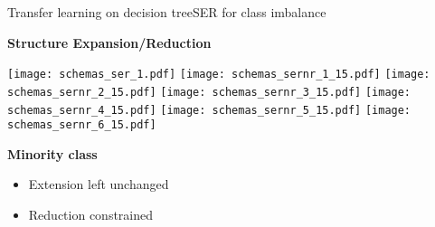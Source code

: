 \begin{frame}{Transfer learning on decision tree}{SER for class imbalance}
\begin{minipage}[t]{0.49\linewidth}
    \vspace{0pt}
    
    \centering
    \textbf{Structure Expansion/Reduction}\\
        
    \renewcommand{\ratio}{0.8}
    \begin{overprint}
        \texttt{[image: schemas\_ser\_1.pdf]}
        \texttt{[image: schemas\_sernr\_1\_15.pdf]}
        \texttt{[image: schemas\_sernr\_2\_15.pdf]}
        \texttt{[image: schemas\_sernr\_3\_15.pdf]}
        \texttt{[image: schemas\_sernr\_4\_15.pdf]}
        \texttt{[image: schemas\_sernr\_5\_15.pdf]}
        \texttt{[image: schemas\_sernr\_6\_15.pdf]}
    \end{overprint}
    \textcolor{mygreen}{\textbf{Minority class}}
\end{minipage}\hfill
\begin{minipage}[t]{0.35\linewidth}
    \vspace{0pt}
    \vspace{1.5cm}
    \begin{itemize}
    \item Extension left unchanged
    \item Reduction constrained
    \end{itemize}
%         

    

\end{minipage}

\end{frame}

